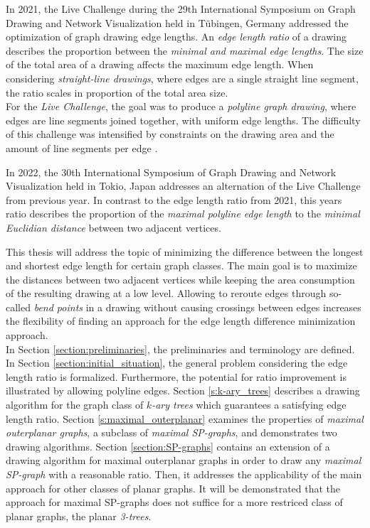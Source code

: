 \bigskip

In 2021, the Live Challenge during the 29th International Symposium on Graph Drawing and Network Visualization held in Tübingen, Germany addressed the optimization of graph drawing edge lengths. An \emph{edge length ratio} of a drawing describes the proportion between the \emph{minimal and maximal edge lengths}. The size of the total area of a drawing affects the maximum edge length. When considering \emph{straight-line drawings}, where edges are a single straight line segment, the ratio scales in proportion of the total area size.\\
For the \emph{Live Challenge}, the goal was to produce a \emph{polyline graph drawing}, where edges are line segments joined together, with uniform edge lengths. 
The difficulty of this challenge was intensified by constraints on the drawing area and the amount of line segments per edge \cite{GD:2021_Challenge}.

\bigskip


In 2022, the 30th International Symposium of Graph Drawing and Network Visualization held in Tokio, Japan \cite{GD:2022_Challenge} addresses an alternation of the Live Challenge from previous year. In contrast to the edge length ratio from 2021, this years ratio describes the proportion of the \emph{maximal polyline edge length} to the \emph{minimal Euclidian distance} between two adjacent vertices. 

\bigskip


This thesis will address the topic of minimizing the difference between the longest and shortest edge length for certain graph classes. The main goal is to maximize the distances between two adjacent vertices while keeping the area consumption of the resulting drawing at a low level. Allowing to reroute edges through so-called \emph{bend points} in a drawing without causing crossings between edges increases the flexibility of finding an approach for the edge length difference minimization approach.\\
In Section \ref{section:preliminaries}, the preliminaries and terminology are defined. 
In Section \ref{section:initial_situation}, the general problem considering the edge length ratio is formalized. Furthermore, the potential for ratio improvement is illustrated by allowing polyline edges. 
Section \ref{s:k-ary_trees} describes a drawing algorithm for the graph class of \emph{$k$-ary trees} which guarantees a satisfying edge length ratio.
Section \ref{s:maximal_outerplanar} examines the properties of \emph{maximal outerplanar graphs}, a subclass of \emph{maximal SP-graphs}, and demonstrates two drawing algorithms.
Section \ref{section:SP-graphs} contains an extension of a drawing algorithm for maximal outerplanar graphs in order to draw any \emph{maximal SP-graph} with a reasonable ratio. Then, it addresses the applicability of the main approach for other classes of planar graphs. It will be demonstrated that the approach for maximal SP-graphs does not suffice for a more restriced class of planar graphs, the planar \emph{3-trees}.